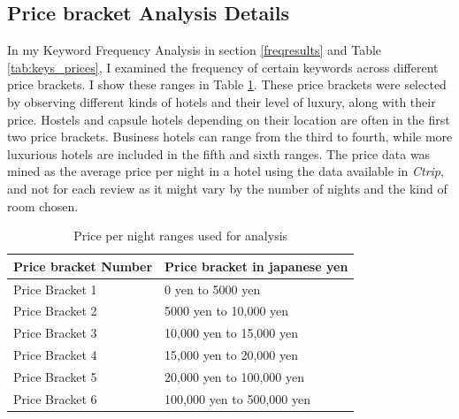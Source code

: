 \documentclass[review]{elsarticle}
\begin{document}
\clearpage
\begin{appendices}

\section{Price bracket Analysis Details}\label{appendix:price_ranges}

In my Keyword Frequency Analysis in section \ref{freqresults} and Table \ref{tab:keys_prices}, I examined the frequency of certain keywords across different price brackets. I show these ranges in Table \ref{tab:price_ranges}. These price brackets were selected by observing different kinds of hotels and their level of luxury, along with their price. Hostels and capsule hotels depending on their location are often in the first two price brackets. Business hotels can range from the third to fourth, while more luxurious hotels are included in the fifth and sixth ranges. The price data was mined as the average price per night in a hotel using the data available in \textit{Ctrip}, and not for each review as it might vary by the number of nights and the kind of room chosen.

\begin{table}[hbp] \centering
\caption{Price per night ranges used for analysis}\label{tab:price_ranges}
\begin{tabular}{|l|l|}
\hline
\multicolumn{1}{|c|}{\textbf{Price bracket Number}} & \multicolumn{1}{c|}{\textbf{Price bracket in japanese yen}} \\ \hline
Price Bracket 1 & 0 yen to 5000 yen \\ \hline
Price Bracket 2 & 5000 yen to 10,000 yen \\ \hline
Price Bracket 3 & 10,000 yen to 15,000 yen \\ \hline
Price Bracket 4 & 15,000 yen to 20,000 yen \\ \hline
Price Bracket 5 & 20,000 yen to 100,000 yen \\ \hline
Price Bracket 6 & 100,000 yen to 500,000 yen \\ \hline
\end{tabular}
\end{table}
\end{appendices}
\end{document}
